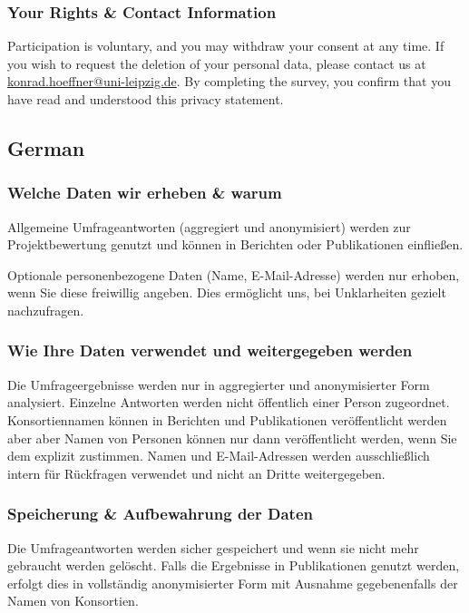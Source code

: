 \documentclass[headsepline,titlepage,twoside,12pt,toc=flat,headings=normal]{scrreprt}
\begin{document}
\subsubsection{Your Rights \& Contact Information}\label{your-rights-contact-information}
Participation is voluntary, and you may withdraw your consent at any time.
If you wish to request the deletion of your personal data, please contact us at \href{mailto:konrad.hoeffner@uni-leipzig.de}{konrad.hoeffner@uni-leipzig.de}.
By completing the survey, you confirm that you have read and understood this privacy statement.

\subsection{German}

\subsubsection{Welche Daten wir erheben \& warum}\label{welche-daten-wir-erheben-warum}
Allgemeine Umfrageantworten (aggregiert und anonymisiert) werden zur Projektbewertung genutzt und können in Berichten oder Publikationen einfließen.

Optionale personenbezogene Daten (Name, E-Mail-Adresse) werden nur erhoben, wenn Sie diese freiwillig angeben.
Dies ermöglicht uns, bei Unklarheiten gezielt nachzufragen.
\subsubsection{Wie Ihre Daten verwendet und weitergegeben werden}
Die Umfrageergebnisse werden nur in aggregierter und anonymisierter Form analysiert.
Einzelne Antworten werden nicht öffentlich einer Person zugeordnet.
Konsortiennamen können in Berichten und Publikationen veröffentlicht werden aber aber Namen von Personen können nur dann veröffentlicht werden, wenn Sie dem explizit zustimmen.
Namen und E-Mail-Adressen werden ausschließlich intern für Rückfragen verwendet und nicht an Dritte weitergegeben.


\subsubsection{Speicherung \& Aufbewahrung der Daten}
Die Umfrageantworten werden sicher gespeichert und wenn sie nicht mehr gebraucht werden gelöscht.
Falls die Ergebnisse in Publikationen genutzt werden, erfolgt dies in vollständig anonymisierter Form mit Ausnahme gegebenenfalls der Namen von Konsortien.
\end{document}
